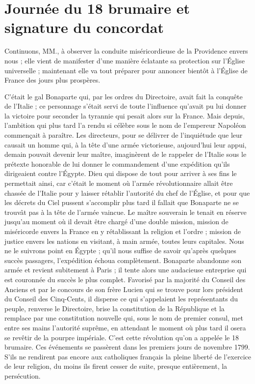 \chapter{Journée du 18 brumaire et signature du concordat}

Continuons, MM., à observer la conduite miséricordieuse de la Providence envers nous ; elle vient de manifester d'une manière éclatante sa protection sur l'Église universelle ; maintenant elle va tout préparer pour annoncer bientôt à l'Église de France des jours plus prospères.

C'était le gal Bonaparte qui, par les ordres du Directoire, avait fait la conquête de l'Italie ; ce personnage s'était servi de toute l'influence qu'avait pu lui donner la victoire pour seconder la tyrannie qui pesait alors sur la France. Mais depuis, l'ambition qui plus tard l'a rendu si célèbre sous le nom de l'empereur Napoléon commençait à paraître. Les directeurs, pour se délivrer de l'inquiétude que leur causait un homme qui, à la tête d'une armée victorieuse, aujourd'hui leur appui, demain pouvait devenir leur maître, imaginèrent de le rappeler de l'Italie sous le prétexte honorable de lui donner le commandement d'une expédition qu'ils dirigeaient contre l'Égypte. Dieu qui dispose de tout pour arriver à ses fins le permettait ainsi, car c'était le moment où l'armée révolutionnaire allait être chassée de l'Italie pour y laisser rétablir l'autorité du chef de l'Église, et pour que les décrets du Ciel pussent s'accomplir plus tard il fallait que Bonaparte ne se
trouvât pas à la tête de l'armée vaincue. Le maître souverain le tenait en réserve jusqu'au moment où il devait être chargé d'une double mission, mission de miséricorde envers la France en y rétablissant la religion et l'ordre ; mission de justice envers les nations en visitant, à main armée, toutes leurs capitales. Nous ne le suivrons point en Égypte ; qu'il nous suffise de savoir qu'après quelques succès passagers, l'expédition échoua complètement. Bonaparte abandonne son armée et revient subitement à Paris ; il tente alors une audacieuse entreprise qui est couronnée du succès le plus complet. Favorisé par la majorité du Conseil des Anciens et par le concours de son frère Lucien qui se trouve pour lors président du Conseil des Cinq-Cents, il disperse ce qui s'appelaient les représentants du peuple, renverse le Directoire, brise la constitution de la République et la remplace par une constitution nouvelle qui, sous le nom de premier consul, met entre ses mains l'autorité suprême, en attendant le moment où plus tard il osera se revêtir de la pourpre impériale. C'est cette révolution qu'on a appelée le 18 brumaire. Ces événements se passèrent dans les premiers jours de novembre 1799. S'ils ne rendirent pas encore aux catholiques français la pleine liberté de l'exercice de leur religion, du moins ils firent cesser de suite, presque entièrement, la persécution.

